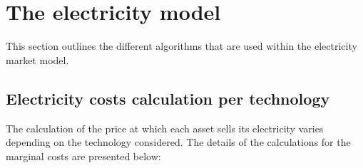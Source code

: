 \section{The electricity model}
\label{sec:ImplementationElec}

This section outlines the different algorithms that are used within the electricity market model.

\subsection{Electricity costs calculation per technology}


The calculation of the price at which each asset sells its electricity varies depending on the technology considered. The details of the calculations for the marginal costs are presented below:

